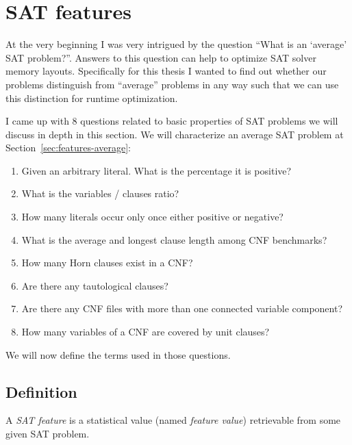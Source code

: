 \renewcommand*\chappic{img/satfeatures.pdf}
\renewcommand*\chapquote{To be usable effectively [\dots] these features must be related to instance hardness and relatively cheap to compute}
\renewcommand*\chapquotesrc{SATzilla}
\chapter{SAT features}
\label{ch:features}
%
At the very beginning I was very intrigued by the question
\enquote{What is an \enquote{average} SAT problem?}. Answers to this
question can help to optimize SAT solver memory layouts.
Specifically for this thesis I wanted to find out whether
our problems distinguish from \enquote{average} problems in any
way such that we can use this distinction for runtime optimization.

I came up with 8 questions related to basic properties of SAT problems
we will discuss in depth in this section. We will characterize an
average SAT problem at Section~\ref{sec:features-average}:
\begin{enumerate}
\item Given an arbitrary literal. What is the percentage it is positive?
\item What is the variables / clauses ratio?
\item How many literals occur only once either positive or negative?
\item What is the average and longest clause length among CNF benchmarks?
\item How many Horn clauses exist in a CNF?
\item Are there any tautological clauses?
\item Are there any CNF files with more than one connected variable component?
\item How many variables of a CNF are covered by unit clauses?
\end{enumerate}

We will now define the terms used in those questions.

\section{Definition}
\label{sec:features-definition}
%
\begin{defi}
  A \emph{SAT feature} is a statistical value (named \emph{feature value})
  retrievable from some given SAT problem.
\end{defi}

